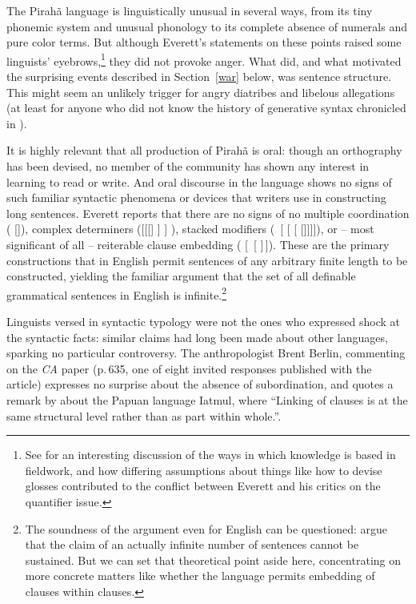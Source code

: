 \documentclass[output=paper,colorlinks,citecolor=brown
]{langscibook}
\begin{document}
The Pirah{\~a} language is linguistically unusual in several ways,
from its tiny phonemic system and unusual phonology to its complete
absence of numerals and pure color terms. But although Everett's
statements on these points raised some linguists'
eyebrows,\footnote{\label{dobrin}%
   See \citealt{DobrSchw21} for an interesting discussion of the ways
   in which knowledge is based in fieldwork, and how differing
   assumptions about things like how to devise glosses contributed
   to the conflict between Everett and his critics on the quantifier
   issue.}
they did not provoke anger. What did, and what motivated the surprising
events described in Section~\ref{war} below, was sentence structure.
This might seem an unlikely trigger for angry diatribes and libelous
allegations (at least for anyone who did not know the history of
generative syntax chronicled in \citealt{Harris21}).

It is highly relevant that all production of Pirah{\~a} is oral:
though an orthography has been devised, no member of the community
has shown any interest in learning to read or write. And oral
discourse in the language shows no signs of such familiar syntactic
phenomena or devices that writers use in constructing long sentences.
Everett reports that there are no signs of no multiple coordination
( []),
complex determiners ([[[] ] ]
), stacked modifiers (~[ [
[ []]]]), or -- most significant
of all -- reiterable clause embedding ( [\, [\,\,]\,]). These are the primary
constructions that in English permit sentences of any arbitrary finite
length to be constructed, yielding the familiar argument that the set
of all definable grammatical sentences in English is
infinite.\footnote{\label{infinity}%
   The soundness of the argument even for English can be questioned:
   \citet[115--124]{PullScho10} argue that
   the claim of an actually infinite number of sentences cannot be
   sustained. But we can set that theoretical point aside here,
   concentrating on more concrete matters like whether the language
   permits embedding of clauses within clauses.}

\label{page-non-infinite-languages-start}Linguists versed in syntactic
typology were not the ones who expressed shock at the syntactic facts:
similar claims had long been made about other languages, sparking no
particular controversy. The anthropologist Brent Berlin, commenting
on the \textit{CA} paper (p.\,635, one of eight invited responses
published with the article) expresses no surprise about the absence
of subordination, and quotes a remark by \citet[177]{Foley86}
about the Papuan language Iatmul, where ``Linking of clauses is at the
same structural level rather than as part within whole.''.
\end{document}
